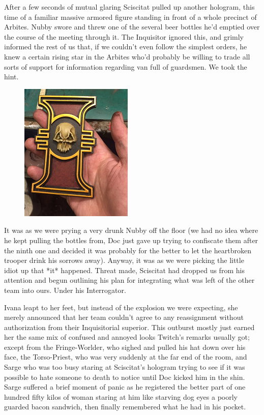 After a few seconds of mutual glaring Sciscitat pulled up another hologram, this time of a familiar massive armored figure standing in front of a whole precinct of Arbites. 
Nubby swore and threw one of the several beer bottles he'd emptied over the course of the meeting through it. 
The Inquisitor ignored this, and grimly informed the rest of us that, if we couldn't even follow the simplest orders, he knew a certain rising star in the Arbites who'd probably be willing to trade all sorts of support for information regarding van full of guardsmen. 
We took the hint.

\begin{figure}
	\begin{center}
		\includegraphics[width=\figwidth]{pics/19/15.png}
	\end{center}
\end{figure}
It was as we were prying a very drunk Nubby off the floor (we had no idea where he kept pulling the bottles from, Doc just gave up trying to confiscate them after the ninth one and decided it was probably for the better to let the heartbroken trooper drink his sorrows away). 
Anyway, it was as we were picking the little idiot up that *it* happened. 
Threat made, Sciscitat had dropped us from his attention and begun outlining his plan for integrating what was left of the other team into ours. 
Under his Interrogator. 


Ivana leapt to her feet, but instead of the explosion we were expecting, she merely announced that her team couldn't agree to any reassignment without authorization from their Inquisitorial superior. 
This outburst mostly just earned her the same mix of confused and annoyed looks Twitch's remarks usually got; 
except from the Fringe-Worlder, who sighed and pulled his hat down over his face, the Torso-Priest, who was very suddenly at the far end of the room, and Sarge who was too busy staring at Sciscitat's hologram trying to see if it was possible to hate someone to death to notice until Doc kicked him in the shin. 
Sarge suffered a brief moment of panic as he registered the better part of one hundred fifty kilos of woman staring at him like starving dog eyes a poorly guarded bacon sandwich, then finally remembered what he had in his pocket.

